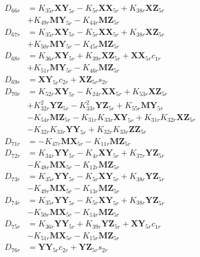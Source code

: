 \begin{multicols}{2}
\begin{align}
D_{66r} &= K_{35r}\mathbf{XY}_{5r} - K_{5r}\mathbf{XX}_{5r} + K_{38r}\mathbf{XZ}_{5r}  \nonumber \\
&+ K_{49r}\mathbf{MY}_{5r} - K_{44r}\mathbf{MZ}_{5r} \nonumber \\
D_{67r} &= K_{35r}\mathbf{XY}_{5r} - K_{5r}\mathbf{XX}_{5r} + K_{38r}\mathbf{XZ}_{5r}  \nonumber \\
&+ K_{50r}\mathbf{MY}_{5r} - K_{45r}\mathbf{MZ}_{5r} \nonumber \\
D_{68r} &= K_{36r}\mathbf{XY}_{5r} + K_{39r}\mathbf{XZ}_{5r} + \mathbf{XX}_{5r}c_{1r}  \nonumber \\
&+ K_{51r}\mathbf{MY}_{5r} - K_{46r}\mathbf{MZ}_{5r} \nonumber \\
D_{69r} &= \mathbf{XY}_{5r}c_{2r} + \mathbf{XZ}_{5r}s_{2r} \nonumber \\
D_{70r} &= K_{52r}\mathbf{XY}_{5r} - K_{24r}\mathbf{XX}_{5r} + K_{53r}\mathbf{XZ}_{5r}  \nonumber \\
&+ K_{32r}^2\mathbf{YZ}_{5r} - K_{33r}^2\mathbf{YZ}_{5r} + K_{55r}\mathbf{MY}_{5r}  \nonumber \\
&- K_{54r}\mathbf{MZ}_{5r} - K_{31r}K_{33r}\mathbf{XY}_{5r} + K_{31r}K_{32r}\mathbf{XZ}_{5r}  \nonumber \\
&- K_{32r}K_{33r}\mathbf{YY}_{5r} + K_{32r}K_{33r}\mathbf{ZZ}_{5r} \nonumber \\
D_{71r} &= - K_{47r}\mathbf{MX}_{5r} - K_{11r}\mathbf{MZ}_{5r} \nonumber \\
D_{72r} &= K_{34r}\mathbf{YY}_{5r} - K_{4r}\mathbf{XY}_{5r} + K_{37r}\mathbf{YZ}_{5r}  \nonumber \\
&- K_{48r}\mathbf{MX}_{5r} - K_{12r}\mathbf{MZ}_{5r} \nonumber \\
D_{73r} &= K_{35r}\mathbf{YY}_{5r} - K_{5r}\mathbf{XY}_{5r} + K_{38r}\mathbf{YZ}_{5r}  \nonumber \\
&- K_{49r}\mathbf{MX}_{5r} - K_{13r}\mathbf{MZ}_{5r} \nonumber \\
D_{74r} &= K_{35r}\mathbf{YY}_{5r} - K_{5r}\mathbf{XY}_{5r} + K_{38r}\mathbf{YZ}_{5r}  \nonumber \\
&- K_{50r}\mathbf{MX}_{5r} - K_{14r}\mathbf{MZ}_{5r} \nonumber \\
D_{75r} &= K_{36r}\mathbf{YY}_{5r} + K_{39r}\mathbf{YZ}_{5r} + \mathbf{XY}_{5r}c_{1r}  \nonumber \\
&- K_{51r}\mathbf{MX}_{5r} - K_{15r}\mathbf{MZ}_{5r} \nonumber \\
D_{76r} &= \mathbf{YY}_{5r}c_{2r} + \mathbf{YZ}_{5r}s_{2r} \nonumber \\

\end{align}
\end{multicols}
